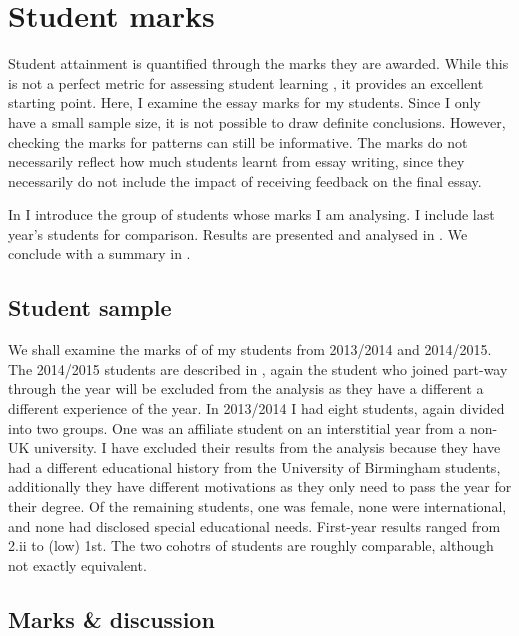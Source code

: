 \chapter{Student marks}\label{ap:marks}

Student attainment is quantified through the marks they are awarded. While this is not a perfect metric for assessing student learning \citep[cf.][chapter 11]{Ramsden1992}, it provides an excellent starting point. Here, I examine the essay marks for my students. Since I only have a small sample size, it is not possible to draw definite conclusions. However, checking the marks for patterns can still be informative. The marks do not necessarily reflect how much students learnt from essay writing, since they necessarily do not include the impact of receiving feedback on the final essay.

In  I introduce the group of students whose marks I am analysing. I include last year's students for comparison. Results are presented and analysed in . We conclude with a summary in .

\section{Student sample}\label{sec:marks-student}

We shall examine the marks of of my students from 2013/2014 and 2014/2015. The 2014/2015 students are described in , again the student who joined part-way through the year will be excluded from the analysis as they have a different a different experience of the year. In 2013/2014 I had eight students, again divided into two groups. One was an affiliate student on an interstitial year from a non-UK university. I have excluded their results from the analysis because they have had a different educational history from the University of Birmingham students, additionally they have different motivations as they only need to pass the year for their degree. Of the remaining students, one was female, none were international, and none had disclosed special educational needs. First-year results ranged from 2.ii to (low) 1st. The two cohotrs of students are roughly comparable, although not exactly equivalent.

\section{Marks \& discussion}\label{sec:plots}

